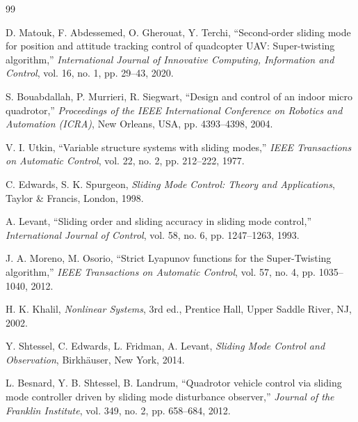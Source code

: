 \documentclass[12pt,a4paper]{report}
\begin{document}
\begin{thebibliography}{99}

D. Matouk, F. Abdessemed, O. Gherouat, Y. Terchi,
``Second-order sliding mode for position and attitude tracking control of quadcopter UAV: Super-twisting algorithm,''
\textit{International Journal of Innovative Computing, Information and Control},
vol. 16, no. 1, pp. 29--43, 2020.

S. Bouabdallah, P. Murrieri, R. Siegwart,
``Design and control of an indoor micro quadrotor,''
\textit{Proceedings of the IEEE International Conference on Robotics and Automation (ICRA)},
New Orleans, USA, pp. 4393--4398, 2004.

V. I. Utkin,
``Variable structure systems with sliding modes,''
\textit{IEEE Transactions on Automatic Control},
vol. 22, no. 2, pp. 212--222, 1977.

C. Edwards, S. K. Spurgeon,
\textit{Sliding Mode Control: Theory and Applications},
Taylor \& Francis, London, 1998.

A. Levant,
``Sliding order and sliding accuracy in sliding mode control,''
\textit{International Journal of Control},
vol. 58, no. 6, pp. 1247--1263, 1993.

J. A. Moreno, M. Osorio,
``Strict Lyapunov functions for the Super-Twisting algorithm,''
\textit{IEEE Transactions on Automatic Control},
vol. 57, no. 4, pp. 1035--1040, 2012.

H. K. Khalil,
\textit{Nonlinear Systems},
3rd ed., Prentice Hall, Upper Saddle River, NJ, 2002.

Y. Shtessel, C. Edwards, L. Fridman, A. Levant,
\textit{Sliding Mode Control and Observation},
Birkh\"auser, New York, 2014.

L. Besnard, Y. B. Shtessel, B. Landrum,
``Quadrotor vehicle control via sliding mode controller driven by sliding mode disturbance observer,''
\textit{Journal of the Franklin Institute},
vol. 349, no. 2, pp. 658--684, 2012.

\end{thebibliography}
\end{document}
